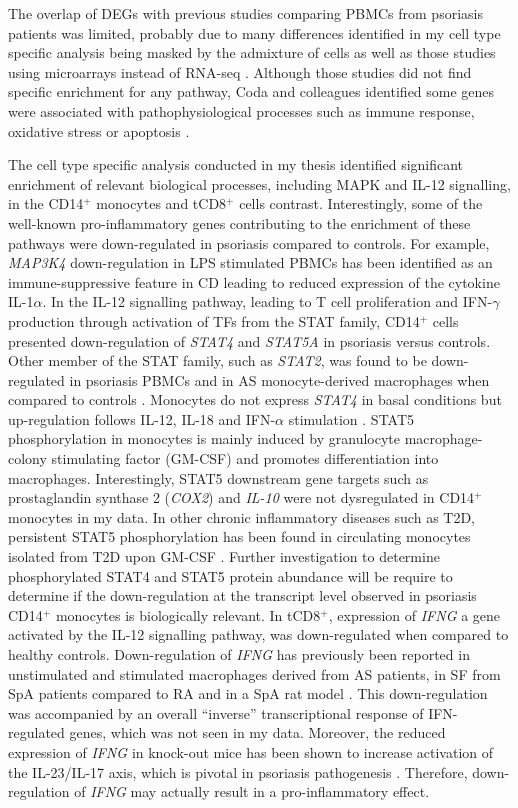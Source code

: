 The overlap of DEGs with previous studies comparing PBMCs from psoriasis patients was limited, probably due to many differences identified in my cell type specific analysis being masked by the admixture of cells as well as those studies using microarrays instead of RNA-seq \parencite{Lee2009,Coda2012}. Although those studies did not find specific enrichment for any pathway, Coda and colleagues identified some genes were associated with pathophysiological processes such as immune response, oxidative stress or apoptosis \parencite{Coda2012.}. 

The cell type specific analysis conducted in my thesis identified significant enrichment of relevant biological processes, including MAPK and IL-12 signalling, in the CD14$^+$ monocytes and tCD8$^+$ cells contrast. Interestingly, some of the well-known pro-inflammatory genes contributing to the enrichment of these pathways were down-regulated in psoriasis compared to controls. For example, \textit{MAP3K4} down-regulation in LPS stimulated PBMCs has been identified as an immune-suppressive feature in CD leading to reduced expression of the cytokine IL-1$\alpha$. In the IL-12 signalling pathway, leading to T cell proliferation and IFN-$\gamma$ production through activation of TFs from the STAT family, CD14$^+$ cells presented down-regulation of \textit{STAT4} and \textit{STAT5A} in psoriasis versus controls. Other member of the STAT family, such as \textit{STAT2}, was found to be down-regulated in psoriasis PBMCs and in AS monocyte-derived macrophages when compared to controls \parencite{Coda2012,Smith2008}. Monocytes do not express \textit{STAT4} in basal conditions but up-regulation follows IL-12, IL-18 and IFN-$\alpha$ stimulation \parencite{Frucht2000,Schindler2001}. STAT5 phosphorylation in monocytes is mainly induced by granulocyte macrophage-colony stimulating factor (GM-CSF) and promotes differentiation into macrophages. Interestingly, STAT5 downstream gene targets such as prostaglandin synthase 2 (\textit{COX2}) and \textit{IL-10} were not dysregulated in CD14$^+$ monocytes in my data. In other chronic inflammatory diseases such as T2D, persistent STAT5 phosphorylation has been found in circulating monocytes isolated from T2D upon GM-CSF \parencite{Litherland2005}. Further investigation to determine phosphorylated STAT4 and STAT5 protein abundance will be require to determine if the down-regulation at the transcript level observed in psoriasis CD14$^+$ monocytes is biologically relevant. In tCD8$^+$, expression of \textit{IFNG} a gene activated by the IL-12 signalling pathway, was down-regulated when compared to healthy controls. Down-regulation of \textit{IFNG} has previously been reported in unstimulated and stimulated macrophages derived from AS patients, in SF from SpA patients compared to RA and in a SpA rat model \parencite{Smith2008,Fert2014, }. This down-regulation was accompanied by an overall “inverse” transcriptional response of IFN-regulated genes, which was not seen in my data. Moreover, the reduced expression of \textit{IFNG} in knock-out mice has been shown to increase activation of the IL-23/IL-17 axis, which is pivotal in psoriasis pathogenesis \parencite{Canete2000,Chu2007}. Therefore, down-regulation of \textit{IFNG} may actually result in a pro-inflammatory effect. 

